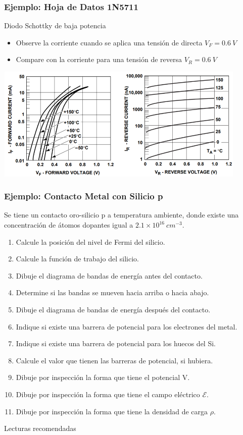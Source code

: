 \documentclass[10pt,t,aspectratio=169]{beamer}
\begin{document}
\begin{frame}[t]
    \frametitle{Ejemplo: Hoja de Datos 1N5711}
    
    Diodo Schottky de baja potencia

    \begin{itemize}
        \item Observe la corriente cuando se aplica una tensión de directa $V_F = 0.6\ V$
        \item Compare con la corriente para una tensión de reversa $V_R = 0.6\ V$
    \end{itemize}

    \centering
    \includegraphics[width=12cm]{./figures/diodo-schottky-3.png}
\end{frame}


\begin{frame}[t]
    \frametitle{Ejemplo: Contacto Metal con Silicio p}

    Se tiene un contacto oro-silicio p a temperatura ambiente, donde existe una concentración de átomos dopantes igual a $2.1\times{}10^{16}\ cm^{-3}$.

    \begin{enumerate}
        \item Calcule la posición del nivel de Fermi del silicio.
        \item Calcule la función de trabajo del silicio.
        \item Dibuje el diagrama de bandas de energía antes del contacto.
        \item Determine si las bandas se mueven hacia arriba o hacia abajo.
        \item Dibuje el diagrama de bandas de energía después del contacto.
        \item Indique si existe una barrera de potencial para los electrones del metal.
        \item Indique si existe una barrera de potencial para los huecos del Si.
        \item Calcule el valor que tienen las barreras de potencial, si hubiera.
        \item Dibuje por inspección la forma que tiene el potencial V.
        \item Dibuje por inspección la forma que tiene el campo eléctrico $\mathcal{E}$.
        \item Dibuje por inspección la forma que tiene la densidad de carga $\rho$.
    \end{enumerate}
\end{frame}


\begin{frame}{Lecturas recomendadas}
    
\end{frame}
\end{document}
